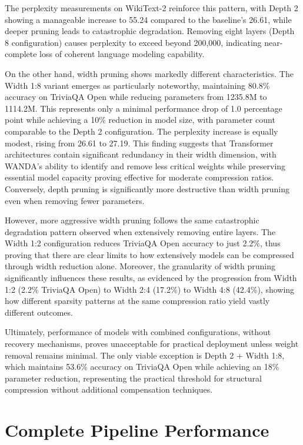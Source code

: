 The perplexity measurements on WikiText-2 reinforce this pattern, with Depth 2 showing a manageable increase to 55.24 compared to the baseline's 26.61, while deeper pruning leads to catastrophic degradation. Removing eight layers (Depth 8 configuration) causes perplexity to exceed beyond 200,000, indicating near-complete loss of coherent language modeling capability.

On the other hand, width pruning shows markedly different characteristics. The Width 1:8 variant emerges as particularly noteworthy, maintaining 80.8\% accuracy on TriviaQA Open while reducing parameters from 1235.8M to 1114.2M. This represents only a minimal performance drop of 1.0 percentage point while achieving a 10\% reduction in model size, with parameter count comparable to the Depth 2 configuration. The perplexity increase is equally modest, rising from 26.61 to 27.19. This finding suggests that Transformer architectures contain significant redundancy in their width dimension, with WANDA's ability to identify and remove less critical weights while preserving essential model capacity proving effective for moderate compression ratios. Conversely, depth pruning is significantly more destructive than width pruning even when removing fewer parameters.

However, more aggressive width pruning follows the same catastrophic degradation pattern observed when extensively removing entire layers. The Width 1:2 configuration reduces TriviaQA Open accuracy to just 2.2\%, thus proving that there are clear limits to how extensively models can be compressed through width reduction alone.
Moreover, the granularity of width pruning significantly influences these results, as evidenced by the progression from Width 1:2 (2.2\% TriviaQA Open) to Width 2:4 (17.2\%) to Width 4:8 (42.4\%), showing how different sparsity patterns at the same compression ratio yield vastly different outcomes.

Ultimately, performance of models with combined configurations, without recovery mechanisms, proves unacceptable for practical deployment unless weight removal remains minimal. The only viable exception is Depth 2 + Width 1:8, which maintains 53.6\% accuracy on TriviaQA Open while achieving an 18\% parameter reduction, representing the practical threshold for structural compression without additional compensation techniques.



\section{Complete Pipeline Performance}

